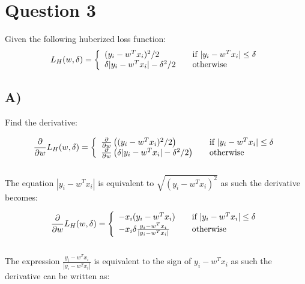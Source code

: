 \documentclass{report}
\begin{document}
\section*{Question 3}
Given the following huberized loss function:
\begin{equation}
  L_H(w, \delta) = \left\{
  \begin{array}{l l}
    (y_i - w^Tx_i)^2 / 2 & \quad \text{if }  | y_i - w^Tx_i | \leq \delta\\
    \delta | y_i - w^Tx_i | - \delta^2 / 2 & \quad \text{otherwise}

  \end{array} \right.\end{equation}


\subsection*{A)}
Find the derivative:

\begin{equation}
  \frac{\partial}{\partial w} L_H(w, \delta) = \left\{
  \begin{array}{l l}
    \frac{\partial}{\partial w} \left((y_i - w^Tx_i)^2 / 2 \right)& \quad \text{if }  | y_i - w^Tx_i | \leq \delta\\
    \frac{\partial}{\partial w} \left(\delta | y_i - w^Tx_i | - \delta^2 / 2\right) & \quad \text{otherwise}

  \end{array} \right.\end{equation}
  \\

The equation $| y_i - w^Tx_i |$ is equivalent to $\sqrt{( y_i - w^Tx_i )^2}$ as such
the derivative becomes:

  \begin{equation}
    \frac{\partial}{\partial w} L_H(w, \delta) = \left\{
    \begin{array}{l l}
      - x_i (y_i - w^Tx_i)  & \quad \text{if }  | y_i - w^Tx_i | \leq \delta\\
      - x_i \delta \frac{y_i - w^Tx_i}{| y_i - w^Tx_i |}  & \quad \text{otherwise}

    \end{array} \right.\end{equation}
    \\

The expression $\frac{y_i - w^Tx_i}{| y_i - w^Tx_i |}$ is equivalent to the sign
of $y_i - w^Tx_i$ as such the derivative can be written as:
\end{document}
